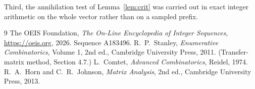 \documentclass[11pt,a4paper]{article}
\theoremstyle{plain}
\theoremstyle{definition}
\begin{document}
Third, the annihilation test of Lemma~\ref{lem:crit} was carried out in exact integer
arithmetic on the whole vector rather than on a sampled prefix.

\begin{thebibliography}{9}
 The OEIS Foundation, \emph{The On-Line Encyclopedia of Integer
Sequences}, \url{https://oeis.org}, 2026. Sequence A183496.
 R.~P.~Stanley, \emph{Enumerative Combinatorics}, Volume 1, 2nd ed.,
Cambridge University Press, 2011. (Transfer-matrix method, Section 4.7.)
 L.~Comtet, \emph{Advanced Combinatorics}, Reidel, 1974.
 R.~A.~Horn and C.~R.~Johnson, \emph{Matrix Analysis}, 2nd ed., Cambridge
University Press, 2013.
\end{thebibliography}
\end{document}
